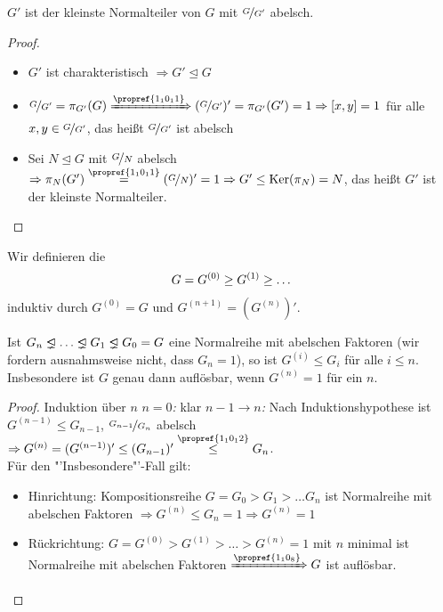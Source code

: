 \begin{lemma}
	$G'$ ist der kleinste Normalteiler von $G$ mit $\nicefrac{G}{G'}$ abelsch.
\end{lemma}
\begin{proof}
	\begin{itemize}
		\item $G'$ ist charakteristisch $\Rightarrow G' \unlhd G$
		\item $\lnkset{G}{G'} = \pi_{G'} (G) \xRightarrow{\propref{1_10_11}} (\lnkset{G}{G'})' = \pi_{G'}(G') = 1 \Rightarrow [x,y] = 1$ für alle $x,y \in \nicefrac{G}{G'}$, das heißt $\nicefrac{G}{G'}$ ist abelsch
		\item Sei $N \unlhd G$ mit $\nicefrac{G}{N}$ abelsch $\Rightarrow \pi_{N}(G') \overset{\propref{1_10_11}}{=} (\lnkset{G}{N})' = 1 \Rightarrow G' \leq \Ker(\pi_{N}) = N$, das heißt $G'$ ist der kleinste Normalteiler.
	\end{itemize}
\end{proof}

\begin{definition}[Kommutatorreihe]
	Wir definieren die 
	\begin{align}
	G = G^{(0)} \geq G^{(1)} \geq \dots\notag
	\end{align}
	induktiv durch $G^{(0)} = G$ und $G^{(n+1)} = (G^{(n)})'$.
\end{definition}

\begin{proposition}
	Ist $G_n \properideal \dots \properideal G_1 \properideal G_0 = G$ eine Normalreihe mit abelschen Faktoren (wir fordern ausnahmsweise nicht, dass $G_n = 1$), so ist $G^{(i)} \le G_i$ für alle $i \leq n$. Insbesondere ist $G$ genau dann auflösbar, wenn $G^{(n)} = 1$ für ein $n$.
\end{proposition}

\begin{proof}
	Induktion über $n$
	\emph{$n = 0$:} klar
	\emph{$n-1 \to n$:} Nach Induktionshypothese ist $G^{(n-1)} \leq G_{n-1}$, $\nicefrac{G_{n-1}}{G_n}$ abelsch $\Rightarrow G^{(n)} = (G^{(n-1)})' \leq (G_{n-1})' \overset{\propref{1_10_12}}{\leq} G_n$.\\
	Für den "'Insbesondere"'-Fall gilt:
	\begin{itemize}
		\item Hinrichtung: Kompositionsreihe $G = G_0 > G_1 > \dots G_n$ ist Normalreihe mit abelschen Faktoren $\Rightarrow G^{(n)} \leq G_n = 1 \Rightarrow G^{(n)} = 1$
		\item Rückrichtung: $G = G^{(0)} > G^{(1)} > \dots > G^{(n)} = 1$ mit $n$ minimal ist Normalreihe mit abelschen Faktoren $\xRightarrow{\propref{1_10_8}} G$ ist auflösbar.
	\end{itemize}
\end{proof}

